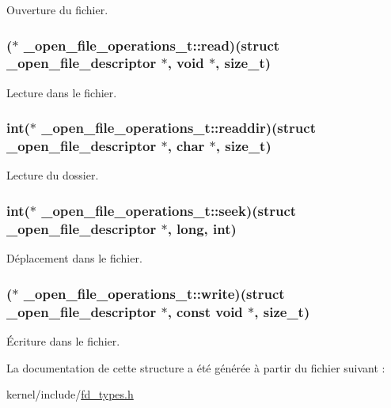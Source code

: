 Ouverture du fichier. \hypertarget{struct__open__file__operations__t_ad5637bc6a752b9a13806748966b77e68}{
\subsubsection[{read}]{($\ast$ \-\_\-open\-\_\-file\-\_\-operations\-\_\-t\-::read)(struct {\bf \-\_\-open\-\_\-file\-\_\-descriptor} $\ast$, void $\ast$, {\bf size\-\_\-t})}}\label{struct__open__file__operations__t_ad5637bc6a752b9a13806748966b77e68}
Lecture dans le fichier. \hypertarget{struct__open__file__operations__t_a7cdb4947735c5559610fb8be2472791d}{
\subsubsection[{readdir}]{\setlength{\rightskip}{0pt plus 5cm}int($\ast$ \-\_\-open\-\_\-file\-\_\-operations\-\_\-t\-::readdir)(struct {\bf \-\_\-open\-\_\-file\-\_\-descriptor} $\ast$, char $\ast$, {\bf size\-\_\-t})}}\label{struct__open__file__operations__t_a7cdb4947735c5559610fb8be2472791d}
Lecture du dossier. \hypertarget{struct__open__file__operations__t_ac45e5e3400e4cd9756b5784289744cc7}{
\subsubsection[{seek}]{\setlength{\rightskip}{0pt plus 5cm}int($\ast$ \-\_\-open\-\_\-file\-\_\-operations\-\_\-t\-::seek)(struct {\bf \-\_\-open\-\_\-file\-\_\-descriptor} $\ast$, long, int)}}\label{struct__open__file__operations__t_ac45e5e3400e4cd9756b5784289744cc7}
Déplacement dans le fichier. \hypertarget{struct__open__file__operations__t_ae730a8e7e44c3b3168b9f091c334b337}{
\subsubsection[{write}]{($\ast$ \-\_\-open\-\_\-file\-\_\-operations\-\_\-t\-::write)(struct {\bf \-\_\-open\-\_\-file\-\_\-descriptor} $\ast$, const void $\ast$, {\bf size\-\_\-t})}}\label{struct__open__file__operations__t_ae730a8e7e44c3b3168b9f091c334b337}
Écriture dans le fichier. 

La documentation de cette structure a été générée à partir du fichier suivant \-:\begin{DoxyCompactItemize}
\item 
kernel/include/\hyperlink{fd__types_8h}{fd\-\_\-types.\-h}\end{DoxyCompactItemize}
